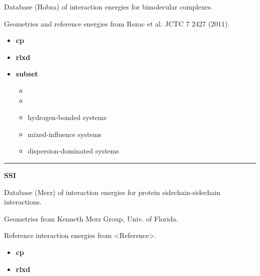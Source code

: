 \documentclass[letterpaper,10pt,english]{sphinxmanual}
\begin{document}
\begin{DUlineblock}{0em}
\item[] Database (Hobza) of interaction energies for bimolecular complexes.
\item[] Geometries and reference energies from Rezac et al. JCTC 7 2427 (2011).
\end{DUlineblock}
\begin{itemize}
\item {} 
\textbf{cp}   \textbar{}\textbar{} 

\item {} 
\textbf{rlxd} 

\item {} 
\textbf{subset}
\begin{itemize}
\item {} 

\item {} 

\item {} 
 hydrogen-bonded systems

\item {} 
 mixed-influence systems

\item {} 
 dispersion-dominated systems

\end{itemize}

\end{itemize}


\bigskip\hrule{}\bigskip

\label{index:module-SSI}
\textbf{SSI}

\begin{DUlineblock}{0em}
\item[] Database (Merz) of interaction energies for protein sidechain-sidechain interactions.
\item[] Geometries from Kenneth Merz Group, Univ. of Florida.
\item[] Reference interaction energies from \textless{}Reference\textgreater{}.
\end{DUlineblock}
\begin{itemize}
\item {} 
\textbf{cp}   \textbar{}\textbar{} 

\item {} 
\textbf{rlxd} 

\end{itemize}
\end{document}
